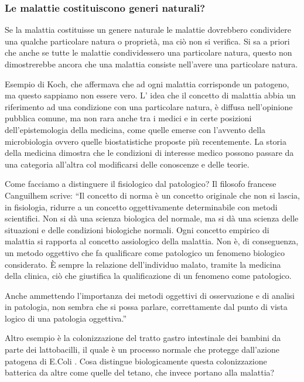   \subsubsection{Le malattie costituiscono generi naturali?}

  Se la malattia costituisse un genere naturale le malattie dovrebbero
  condividere una qualche particolare natura o proprietà, ma ciò non si
  verifica. Si sa a priori che anche se tutte le malattie condividessero
  una particolare natura, questo non dimostrerebbe ancora che una
  malattia consiste nell'avere una particolare natura.

  Esempio di Koch, che affermava che ad ogni malattia corrisponde un
  patogeno, ma questo sappiamo non essere vero. L' idea che il concetto
  di malattia abbia un riferimento ad una condizione con una particolare
  natura, è diffusa nell'opinione pubblica comune, ma non rara anche tra
  i medici e in certe posizioni dell'epistemologia della medicina, come
  quelle emerse con l'avvento della microbiologia ovvero quelle
  biostatistiche proposte più recentemente. La storia della medicina
  dimostra che le condizioni di interesse medico possono passare da una
  categoria all'altra col modificarsi delle conoscenze e delle teorie.

  Come facciamo a distinguere il fisiologico dal patologico? Il filosofo
  francese Canguilhem scrive: ``Il concetto di norma è un concetto
  originale che non si lascia, in fisiologia, ridurre a un concetto
  oggettivamente determinabile con metodi scientifici. Non si dà una
  scienza biologica del normale, ma si dà una scienza delle situazioni e
  delle condizioni biologiche normali. Ogni concetto empirico di
  malattia si rapporta al concetto assiologico della malattia. Non è, di
  conseguenza, un metodo oggettivo che fa qualificare come patologico un
  fenomeno biologico considerato. È sempre la relazione dell'individuo
  malato, tramite la medicina della clinica, ciò che giustifica la
  qualificazione di un fenomeno come patologico.

  Anche ammettendo l'importanza dei metodi oggettivi di osservazione e
  di analisi in patologia, non sembra che si possa parlare,
  correttamente dal punto di vista logico di una patologia oggettiva.''

  Altro esempio è la colonizzazione del tratto gastro intestinale dei
  bambini da parte dei lattobacilli, il quale è un processo normale che
  protegge dall'azione patogena di E.Coli . Cosa distingue
  biologicamente questa colonizzazione batterica da altre come quelle
  del tetano, che invece portano alla malattia?

